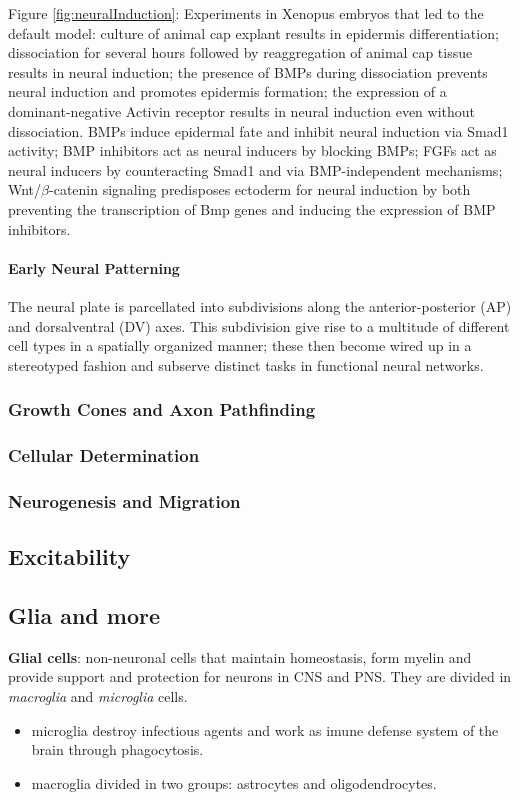\documentclass[12pt,article,oneside,a4paper]{memoir}
\begin{document}
Figure \ref{fig:neuralInduction}: Experiments in Xenopus embryos that led to the default model: culture of animal cap explant results in epidermis differentiation; dissociation for several hours followed by reaggregation of animal cap tissue results in neural induction; the presence of BMPs during dissociation prevents neural induction and promotes epidermis formation; the expression of a dominant-negative Activin receptor results in neural induction even without dissociation. BMPs induce epidermal fate and inhibit neural induction via Smad1 activity; BMP inhibitors act as neural inducers by blocking BMPs; FGFs act as neural inducers by counteracting Smad1 and via BMP-independent mechanisms; Wnt/$\beta$-catenin signaling predisposes ectoderm for neural induction by both preventing the transcription of Bmp genes and inducing the expression of BMP inhibitors.

\paragraph{Early Neural Patterning}
The neural plate is parcellated into subdivisions along the anterior-posterior (AP) and dorsalventral (DV) axes. This subdivision give rise to a multitude of different cell types in a spatially organized manner; these then become wired up in a stereotyped fashion and subserve distinct tasks in functional neural networks.

\subsubsection{Growth Cones and Axon Pathfinding}
\subsubsection{Cellular Determination}
\subsubsection{Neurogenesis and Migration}

\subsection{Excitability}
\subsection{Glia and more}
\textbf{Glial cells}: non-neuronal cells that maintain homeostasis, form myelin and provide support and protection for neurons in CNS and PNS. They are divided in \textit{macroglia} and \textit{microglia} cells.
\begin{itemize}
\item microglia destroy infectious agents and work as imune defense system of the brain through phagocytosis.
\item macroglia divided in two groups: astrocytes and oligodendrocytes.
\end{itemize} 
\end{document}
